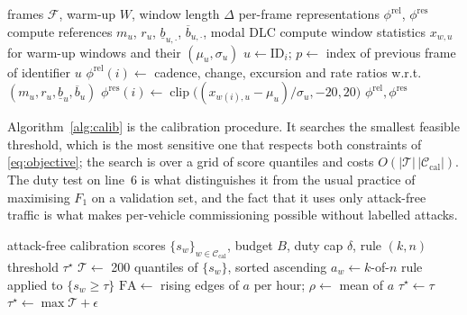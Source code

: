 \documentclass[preprint,11pt,authoryear]{elsarticle}
\newcommand{\phirel}{\phi^{\mathrm{rel}}}
\newcommand{\phires}{\phi^{\mathrm{res}}}
\newcommand{\FA}{\mathrm{FA}}
\begin{document}
\begin{algorithm}[htbp]
\caption{Identifier-agnostic feature construction (per capture, no labels)}
\label{alg:features}
\begin{algorithmic}[1]
\Require frames $\mathcal{F}$, warm-up $W$, window length $\Delta$
\Ensure per-frame representations $\phirel$, $\phires$
  \State compute references $m_u$, $r_u$, $\underline{b}_{u,\cdot}$, $\overline{b}_{u,\cdot}$, modal DLC 
  \State compute window statistics $x_{w,u}$ for warm-up windows and their $(\mu_u,\sigma_u)$
\EndFor
{}
  \State $u\gets \mathrm{ID}_i$; $p\gets$ index of previous frame of identifier $u$
  \State $\phirel(i)\gets$ cadence, change, excursion and rate ratios w.r.t. $(m_u,r_u,\underline{b}_u,\overline{b}_u)$ 
  \State $\phires(i)\gets \operatorname{clip}\big((x_{w(i),u}-\mu_u)/\sigma_u,-20,20\big)$ 
\EndFor
\State \Return $\phirel,\phires$
\end{algorithmic}
\end{algorithm}

Algorithm~\ref{alg:calib} is the calibration procedure. It searches the smallest feasible threshold,
which is the most sensitive one that respects both constraints of \eqref{eq:objective}; the search
is over a grid of score quantiles and costs $O(|\mathcal{T}|\,|\mathcal{C}_{\mathrm{cal}}|)$. The
duty test on line~6 is what distinguishes it from the usual practice of maximising $F_1$ on a
validation set, and the fact that it uses only attack-free traffic is what makes per-vehicle
commissioning possible without labelled attacks.

\begin{algorithm}[htbp]
\caption{Per-vehicle threshold calibration under a false-alarm budget}
\label{alg:calib}
\begin{algorithmic}[1]
\Require attack-free calibration scores $\{s_w\}_{w\in\mathcal{C}_{\mathrm{cal}}}$, budget $B$,
duty cap $\delta$, rule $(k,n)$
\Ensure threshold $\tau^\star$
\State $\mathcal{T}\gets$ 200 quantiles of $\{s_w\}$, sorted ascending
  \State $a_w \gets k$-of-$n$ rule applied to $\{s_w\ge\tau\}$ 
  \State $\FA \gets$ rising edges of $a$ per hour; $\rho \gets$ mean of $a$ 
  \If{$\FA \le B$ \textbf{and} $\rho \le \delta$}
     \State \Return $\tau^\star \gets \tau$ 
  \EndIf
\EndFor
\State \Return $\tau^\star \gets \max\mathcal{T} + \epsilon$ 
\end{algorithmic}
\end{algorithm}
\end{document}
